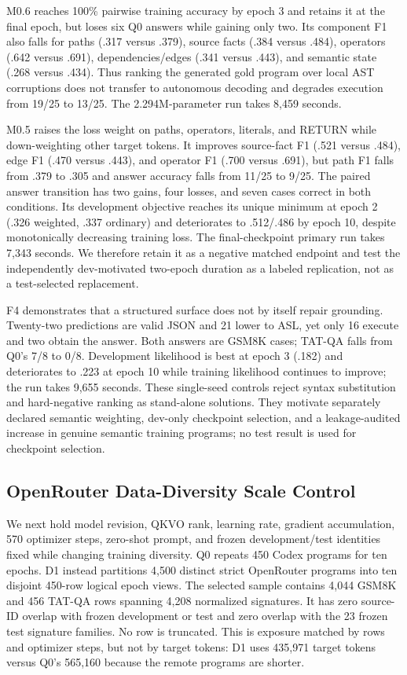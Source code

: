 \documentclass[11pt]{article}
\begin{document}
M0.6 reaches 100\% pairwise training accuracy by epoch 3 and retains it at the
final epoch, but loses six Q0 answers while gaining only two. Its component F1
also falls for paths (.317 versus .379), source facts (.384 versus .484),
operators (.642 versus .691), dependencies/edges (.341 versus .443), and
semantic state (.268 versus .434). Thus ranking the generated gold program over
local AST corruptions does not transfer to autonomous decoding and degrades
execution from 19/25 to 13/25. The 2.294M-parameter run takes 8,459 seconds.

M0.5 raises the loss weight on paths, operators, literals, and RETURN while
down-weighting other target tokens. It improves source-fact F1 (.521 versus
.484), edge F1 (.470 versus .443), and operator F1 (.700 versus .691), but path
F1 falls from .379 to .305 and answer accuracy falls from 11/25 to 9/25. The
paired answer transition has two gains, four losses, and seven cases correct in
both conditions. Its development objective reaches its unique minimum at epoch
2 (.326 weighted, .337 ordinary) and deteriorates to .512/.486 by epoch 10,
despite monotonically decreasing training loss. The final-checkpoint primary
run takes 7,343 seconds. We therefore retain it as a negative matched endpoint
and test the independently dev-motivated two-epoch duration as a labeled
replication, not as a test-selected replacement.

F4 demonstrates that a structured surface does not by itself repair grounding.
Twenty-two predictions are valid JSON and 21 lower to ASL, yet only 16 execute
and two obtain the answer. Both answers are GSM8K cases; TAT-QA falls from Q0's
7/8 to 0/8. Development likelihood is best at epoch 3 (.182) and deteriorates
to .223 at epoch 10 while training likelihood continues to improve; the run
takes 9,655 seconds. These single-seed controls reject syntax substitution and
hard-negative ranking as stand-alone solutions. They motivate separately
declared semantic weighting, dev-only checkpoint selection, and a
leakage-audited increase in genuine semantic training programs; no test result
is used for checkpoint selection.

\subsection{OpenRouter Data-Diversity Scale Control}

We next hold model revision, QKVO rank, learning rate, gradient accumulation,
570 optimizer steps, zero-shot prompt, and frozen development/test identities
fixed while changing training diversity. Q0 repeats 450 Codex programs for ten
epochs. D1 instead partitions 4,500 distinct strict OpenRouter programs into ten
disjoint 450-row logical epoch views. The selected sample contains 4,044 GSM8K
and 456 TAT-QA rows spanning 4,208 normalized signatures. It has zero source-ID
overlap with frozen development or test and zero overlap with the 23 frozen test
signature families. No row is truncated. This is exposure matched by rows and
optimizer steps, but not by target tokens: D1 uses 435,971 target tokens versus
Q0's 565,160 because the remote programs are shorter.
\end{document}

